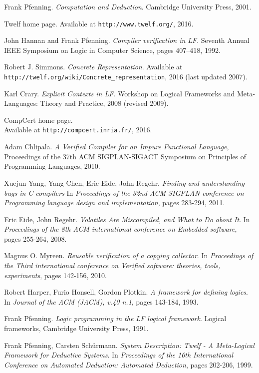\clearpage

\begin{thebibliography}{99}

Frank Pfenning.
\textit{Computation and Deduction}.
Cambridge University Press, 2001.

Twelf home page. Available at \texttt{http://www.twelf.org/}, 2016.

John Hannan and Frank Pfenning.
\textit{Compiler verification in LF}.
Seventh Annual IEEE Symposium on Logic in Computer Science, pages 407–418, 1992.

Robert J. Simmons.
\textit{Concrete Representation}.
Available at \texttt{http://twelf.org/wiki/Concrete\_representation}, 2016 (last updated 2007).

Karl Crary.
\textit{Explicit Contexts in LF}.
Workshop on Logical Frameworks and Meta-Languages: Theory and Practice, 2008 (revised 2009).

CompCert home page. \\
Available at \texttt{http://compcert.inria.fr/}, 2016.

Adam Chlipala.
\textit{A Verified Compiler for an Impure Functional Language},
Proceedings of the 37th ACM SIGPLAN-SIGACT Symposium on Principles of Programming Languages, 2010.

Xuejun Yang, Yang Chen, Eric Eide, John Regehr.
\textit{Finding and understanding bugs in C compilers}
In \textit{Proceedings of the 32nd ACM SIGPLAN conference on Programming language design and implementation}, pages 283-294, 2011.

Eric Eide, John Regehr.
\textit{Volatiles Are Miscompiled, and What to Do about It}.
In \textit{Proceedings of the 8th ACM international conference on Embedded software}, pages 255-264, 2008.

Magnus O. Myreen.
\textit{Reusable verification of a copying collector}.
In \textit{Proceedings of the Third international conference on Verified software: theories, tools, experiments}, pages 142-156, 2010.

Robert Harper, Furio Honsell, Gordon Plotkin.
\textit{A framework for defining logics}.
In \textit{Journal of the ACM (JACM), v.40 n.1}, pages 143-184, 1993.

Frank Pfenning.
\textit{Logic programming in the LF logical framework}.
Logical frameworks, Cambridge University Press, 1991.

Frank Pfenning, Carsten Sch\"{u}rmann.
\textit{System Description: Twelf - A Meta-Logical Framework for Deductive Systems}.
In \textit{Proceedings of the 16th International Conference on Automated Deduction: Automated Deduction}, pages 202-206, 1999.

\end{thebibliography}
